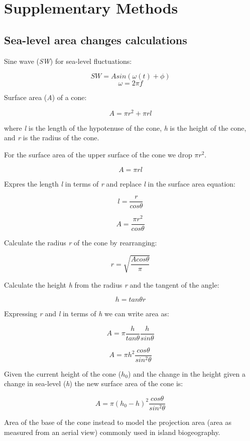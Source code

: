 
\section*{Supplementary Methods}

\subsection*{Sea-level area changes calculations}

Sine wave (\textit{SW}) for sea-level fluctuations:


\[ SW = A sin(\omega(t) + \phi) \]    
\[ \omega = 2 \pi f \]

Surface area (\textit{A}) of a cone:

\[ A = \pi r^2 + \pi r l \]

where \textit{l} is the length of the hypotenuse of the cone, \textit{h} is the height of the cone, and \textit{r} is the radius of the cone. 

For the surface area of the upper surface of the cone we drop $\pi r^2$.

\[ A = \pi r l \]

Expres the length \textit{l} in terms of \textit{r} and replace \textit{l} in the surface area equation:

\[ l = \frac{r}{cos \theta} \]

\[ A = \frac{\pi r^2}{cos \theta} \]

Calculate the radius \textit{r} of the cone by rearranging: 

\[ r = \sqrt{\frac{A cos \theta}{\pi}} \]

Calculate the height \textit{h} from the radius \textit{r} and the tangent of the angle:

\[ h = tan \theta r \]

Expressing \textit{r} and \textit{l} in terms of \textit{h} we can write area as: 

\[ A = \pi \frac{h}{tan \theta} \frac{h}{sin \theta} \]

\[ A = \pi h^2 \frac{cos \theta}{sin^2 \theta} \]

Given the current height of the cone ($h_0$) and the change in the height given a change in sea-level (\textit{h}) the new surface area of the cone is:

\[ A = \pi (h_0 - h)^2 \frac{cos \theta}{sin^2 \theta} \]

Area of the base of the cone instead to model the projection area (area as measured from an aerial view) commonly used in island biogeography. \\

